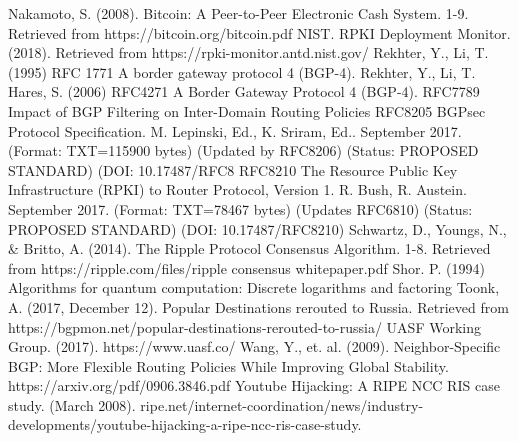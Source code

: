 \documentclass[letterpaper, 10 pt, conference]{ieeeconf}  %
\begin{document}
\begin{thebibliography}{99}
 Nakamoto, S. (2008). Bitcoin: A Peer-to-Peer Electronic Cash System.
1-9. Retrieved from https://bitcoin.org/bitcoin.pdf
 NIST. RPKI Deployment Monitor. (2018). Retrieved from https://rpki-monitor.antd.nist.gov/
 Rekhter, Y., Li, T. (1995) RFC 1771 A border gateway protocol 4 (BGP-4).
 Rekhter, Y., Li, T.  Hares, S. (2006) RFC4271 A Border Gateway Protocol 4 (BGP-4).
 RFC7789 Impact of BGP Filtering on Inter-Domain Routing Policies
 RFC8205 BGPsec Protocol Specification. M. Lepinski, Ed., K. Sriram, Ed..
     September 2017. (Format: TXT=115900 bytes) (Updated by RFC8206)
     (Status: PROPOSED STANDARD) (DOI: 10.17487/RFC8
 RFC8210 The Resource Public Key Infrastructure (RPKI) to Router Protocol,
     Version 1. R. Bush, R. Austein. September 2017. (Format: TXT=78467
     bytes) (Updates RFC6810) (Status: PROPOSED STANDARD) (DOI:
     10.17487/RFC8210)
 Schwartz, D., Youngs, N., \& Britto, A. (2014). The
Ripple Protocol Consensus Algorithm. 1-8. Retrieved from
https://ripple.com/files/ripple consensus whitepaper.pdf
 Shor. P. (1994) Algorithms for quantum computation: Discrete logarithms and factoring
 Toonk, A. (2017, December 12). Popular Destinations rerouted to Russia. Retrieved from https://bgpmon.net/popular-destinations-rerouted-to-russia/
 UASF Working Group. (2017). https://www.uasf.co/
 Wang, Y., et. al. (2009). Neighbor-Specific BGP: More Flexible Routing Policies While Improving Global Stability. https://arxiv.org/pdf/0906.3846.pdf
 Youtube Hijacking: A RIPE NCC RIS case study. (March 2008). ripe.net/internet-coordination/news/industry-developments/youtube-hijacking-a-ripe-ncc-ris-case-study.
\end{thebibliography}
\end{document}
